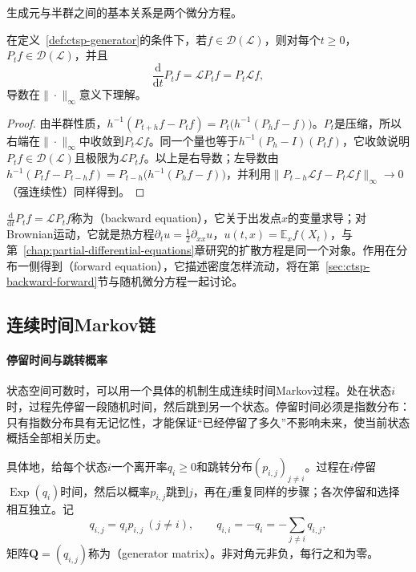 生成元与半群之间的基本关系是两个微分方程。

\begin{theorem}[Kolmogorov方程]
  \label{thm:ctsp-kolmogorov-equations}
  在定义~\ref{def:ctsp-generator}的条件下，若$f\in\mathcal D(\mathcal L)$，则对每个$t\geq0$，$P_tf\in\mathcal D(\mathcal L)$，并且
  \[
    \frac{\mathrm d}{\mathrm dt}P_tf=\mathcal LP_tf=P_t\mathcal Lf ,
  \]
  导数在$\|\cdot\|_\infty$意义下理解。
\end{theorem}

\begin{proof}
由半群性质，$h^{-1}(P_{t+h}f-P_tf)=P_t\bigl(h^{-1}(P_hf-f)\bigr)$。$P_t$是压缩，所以右端在$\|\cdot\|_\infty$中收敛到$P_t\mathcal Lf$。同一个量也等于$h^{-1}(P_h-I)(P_tf)$，它收敛说明$P_tf\in\mathcal D(\mathcal L)$且极限为$\mathcal LP_tf$。以上是右导数；左导数由$h^{-1}(P_tf-P_{t-h}f)=P_{t-h}\bigl(h^{-1}(P_hf-f)\bigr)$，并利用$\|P_{t-h}\mathcal Lf-P_t\mathcal Lf\|_\infty\to0$（强连续性）同样得到。
\end{proof}

$\frac{\mathrm d}{\mathrm dt}P_tf=\mathcal LP_tf$称为（backward equation），它关于出发点$x$的变量求导；对Brownian运动，它就是热方程$\partial_tu=\frac12\partial_{xx}u$，$u(t,x)=\mathbb E_xf(X_t)$，与第~\ref{chap:partial-differential-equations}章研究的扩散方程是同一个对象。作用在分布一侧得到（forward equation），它描述密度怎样流动，将在第~\ref{sec:ctsp-backward-forward}节与随机微分方程一起讨论。

\subsection{连续时间Markov链}
\label{sec:ctsp-ctmc}

\paragraph{停留时间与跳转概率}
状态空间可数时，可以用一个具体的机制生成连续时间Markov过程。处在状态$i$时，过程先停留一段随机时间，然后跳到另一个状态。停留时间必须是指数分布：只有指数分布具有无记忆性，才能保证“已经停留了多久”不影响未来，使当前状态概括全部相关历史。

具体地，给每个状态$i$一个离开率$q_i\geq0$和跳转分布$(p_{i,j})_{j\neq i}$。过程在$i$停留$\operatorname{Exp}(q_i)$时间，然后以概率$p_{i,j}$跳到$j$，再在$j$重复同样的步骤；各次停留和选择相互独立。记
\begin{equation}
  q_{i,j}=q_ip_{i,j}\ (j\neq i),\qquad q_{i,i}=-q_i=-\sum_{j\neq i}q_{i,j},
  \label{eq:ctsp-q-matrix}
\end{equation}
矩阵$\bm Q=(q_{i,j})$称为（generator matrix）。非对角元非负，每行之和为零。

